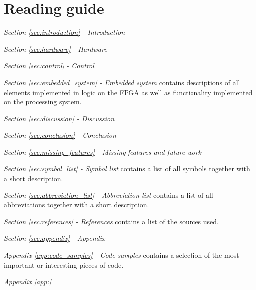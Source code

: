 \section{Reading guide}






\emph{Section \ref{sec:introduction} - Introduction}  

\medskip
\emph{Section \ref{sec:hardware} - Hardware} 

\medskip
\emph{Section \ref{sec:control} - Control} 

\medskip
\emph{Section \ref{sec:embedded_system} - Embedded system} contains descriptions of all elements implemented in logic on the FPGA as well as functionality implemented on the processing system. 

\medskip
\emph{Section \ref{sec:discussion} - Discussion} 

\medskip
\emph{Section \ref{sec:conclusion} - Conclusion} 

\medskip
\emph{Section \ref{sec:missing_features} - Missing features and future work} 

\medskip
\emph{Section \ref{sec:symbol_list} - Symbol list} contains a list of all symbols together with a short description.

\medskip
\emph{Section \ref{sec:abbreviation_list} - Abbreviation list} contains a list of all abbreviations together with a short description.

\medskip
\emph{Section \ref{sec:references} - References} contains a list of the sources used.


\medskip
\emph{Section \ref{sec:appendix} - Appendix} 

\quad \textit{Appendix \ref{app:code_samples} - Code samples} contains a selection of the most important or interesting pieces of code.

\quad \textit{Appendix \ref{app:}} 
